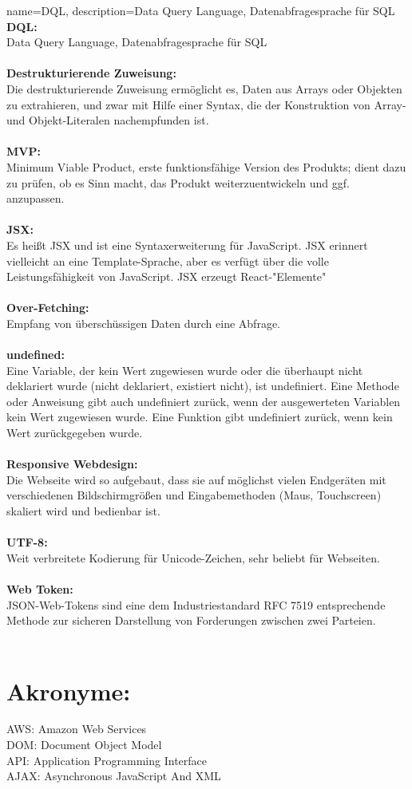 {
    name=DQL,
    description={Data Query Language, Datenabfragesprache für SQL}
}
\textbf{DQL:}\\
Data Query Language, Datenabfragesprache für SQL
\\\\
\textbf{Destrukturierende Zuweisung:}\\
Die destrukturierende Zuweisung ermöglicht es, Daten aus Arrays oder Objekten zu extrahieren, und zwar mit Hilfe einer Syntax, die der Konstruktion von Array- und Objekt-Literalen nachempfunden ist.
\\\\
\textbf{MVP:}\\
Minimum Viable Product, erste funktionsfähige Version des Produkts; dient dazu zu prüfen, ob es Sinn macht, das Produkt weiterzuentwickeln und ggf. anzupassen.
\\\\
\textbf{JSX:}\\
Es heißt JSX und ist eine Syntaxerweiterung für JavaScript. JSX erinnert vielleicht an eine Template-Sprache, aber es verfügt über die volle Leistungsfähigkeit von JavaScript. JSX erzeugt React-"Elemente"
\\\\
\textbf{Over-Fetching:}\\
Empfang von überschüssigen Daten durch eine Abfrage.
\\\\
\textbf{undefined:}\\
Eine Variable, der kein Wert zugewiesen wurde oder die überhaupt nicht deklariert wurde (nicht deklariert, existiert nicht), ist undefiniert. Eine Methode oder Anweisung gibt auch undefiniert zurück, wenn der ausgewerteten Variablen kein Wert zugewiesen wurde. Eine Funktion gibt undefiniert zurück, wenn kein Wert zurückgegeben wurde.
\\\\
\textbf{Responsive Webdesign:}\\
Die Webseite wird so aufgebaut, dass sie auf möglichst vielen Endgeräten mit verschiedenen Bildschirmgrößen und Eingabemethoden (Maus, Touchscreen) skaliert wird und bedienbar ist.
\\\\
\textbf{UTF-8:}\\
Weit verbreitete Kodierung für Unicode-Zeichen, sehr beliebt für Webseiten.\\\\
\textbf{Web Token:}\\
JSON-Web-Tokens sind eine dem Industriestandard RFC 7519 entsprechende Methode zur sicheren Darstellung von Forderungen zwischen zwei Parteien.
\\\\
\section*{Akronyme:}
{AWS}: {Amazon Web Services}\\
{DOM}: {Document Object Model}\\
{API}: {Application Programming Interface}\\
{AJAX}: {Asynchronous JavaScript And XML}\\
